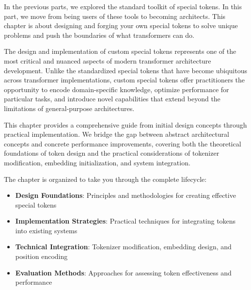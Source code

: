 
In the previous parts, we explored the standard toolkit of special tokens. In this part, we move from being users of these tools to becoming architects. This chapter is about designing and forging your own special tokens to solve unique problems and push the boundaries of what transformers can do.

The design and implementation of custom special tokens represents one of the most critical and nuanced aspects of modern transformer architecture development. Unlike the standardized special tokens that have become ubiquitous across transformer implementations, custom special tokens offer practitioners the opportunity to encode domain-specific knowledge, optimize performance for particular tasks, and introduce novel capabilities that extend beyond the limitations of general-purpose architectures.

This chapter provides a comprehensive guide from initial design concepts through practical implementation. We bridge the gap between abstract architectural concepts and concrete performance improvements, covering both the theoretical foundations of token design and the practical considerations of tokenizer modification, embedding initialization, and system integration.

\begin{comment}
Feedback: This is a great opening. To make it even more exciting for the reader, you could frame it as moving from a user to a creator. For example: "In the previous parts, we explored the standard toolkit of special tokens. In this part, we move from being users of these tools to becoming architects. This chapter is about designing and forging your own special tokens to solve unique problems and push the boundaries of what transformers can do."

STATUS: addressed - integrated the suggested framing into the updated introduction
\end{comment}

The chapter is organized to take you through the complete lifecycle:
\begin{itemize}
\item \textbf{Design Foundations}: Principles and methodologies for creating effective special tokens
\item \textbf{Implementation Strategies}: Practical techniques for integrating tokens into existing systems
\item \textbf{Technical Integration}: Tokenizer modification, embedding design, and position encoding
\item \textbf{Evaluation Methods}: Approaches for assessing token effectiveness and performance
\end{itemize}

